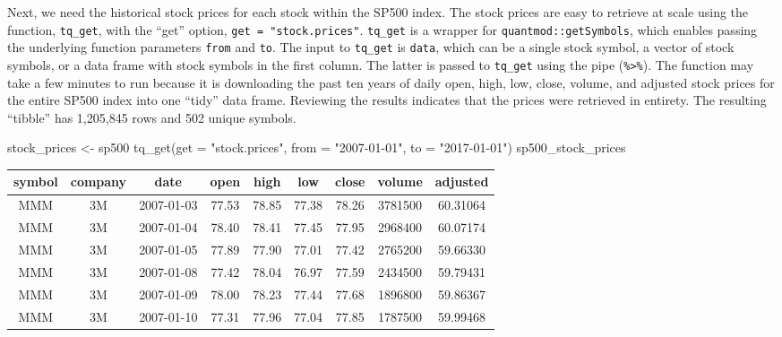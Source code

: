 \hspace{20 mm}

Next, we need the historical stock prices for each stock within the
SP500 index. The stock prices are easy to retrieve at scale using the
function, \texttt{tq\_get}, with the ``get'' option,
\texttt{get\ =\ "stock.prices"}. \texttt{tq\_get} is a wrapper for
\texttt{quantmod::getSymbols}, which enables passing the underlying
function parameters \texttt{from} and \texttt{to}. The input to
\texttt{tq\_get} is \texttt{data}, which can be a single stock symbol, a
vector of stock symbols, or a data frame with stock symbols in the first
column. The latter is passed to \texttt{tq\_get} using the pipe
(\texttt{\%\textgreater{}\%}). The function may take a few minutes to
run because it is downloading the past ten years of daily open, high,
low, close, volume, and adjusted stock prices for the entire SP500 index
into one ``tidy'' data frame. Reviewing the results indicates that the
prices were retrieved in entirety. The resulting ``tibble'' has
1,205,845 rows and 502 unique symbols.

\begin{Schunk}
\begin{Sinput}
stock_prices <- sp500 %
    tq_get(get  = "stock.prices", 
           from = "2007-01-01", 
           to   = "2017-01-01")
sp500_stock_prices
\end{Sinput}
\end{Schunk}

\begin{tabular}{ccccccccc}
\toprule
symbol & company & date & open & high & low & close & volume & adjusted\\
\midrule
MMM & 3M & 2007-01-03 & 77.53 & 78.85 & 77.38 & 78.26 & 3781500 & 60.31064\\
MMM & 3M & 2007-01-04 & 78.40 & 78.41 & 77.45 & 77.95 & 2968400 & 60.07174\\
MMM & 3M & 2007-01-05 & 77.89 & 77.90 & 77.01 & 77.42 & 2765200 & 59.66330\\
MMM & 3M & 2007-01-08 & 77.42 & 78.04 & 76.97 & 77.59 & 2434500 & 59.79431\\
MMM & 3M & 2007-01-09 & 78.00 & 78.23 & 77.44 & 77.68 & 1896800 & 59.86367\\
MMM & 3M & 2007-01-10 & 77.31 & 77.96 & 77.04 & 77.85 & 1787500 & 59.99468\\
\bottomrule
\end{tabular}

\hspace{20 mm}

